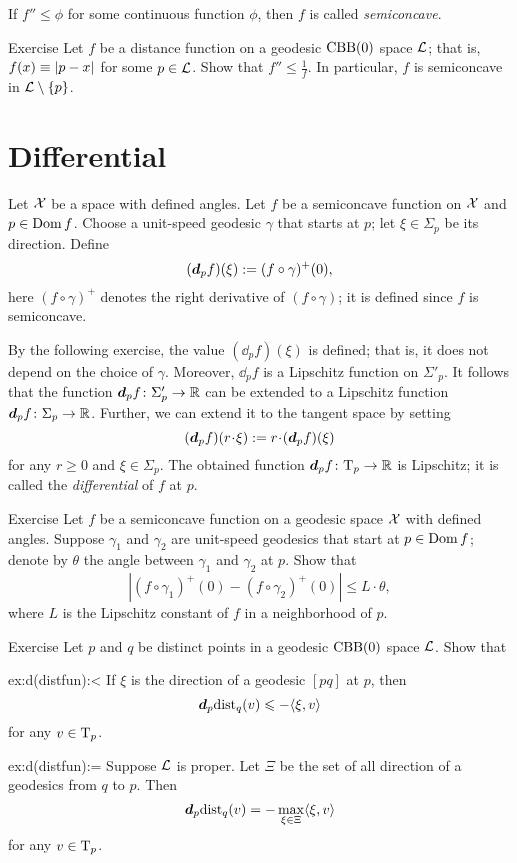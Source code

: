 If $f''\le \phi$ for some continuous function $\phi$, then $f$ is called  \emph{semiconcave}.


\begin{thm}{Exercise}\label{ex:distfun-semiconcave}
Let $f$ be a distance function on a geodesic $\mathrm{CBB}(0)$ space $\mathcal{L}$;
that is, $f(x)\equiv\dist{p}{x}{}$ for some $p\in \mathcal{L}$.
Show that $f''\le \tfrac1f$.
In particular, $f$ is semiconcave in $\mathcal{L}\setminus\{p\}$.
\end{thm}


\section{Differential}

Let $\mathcal{X}$ be a space with defined angles.
Let $f$ be a semiconcave function on $\mathcal{X}$ and $p\in \mathop{\rm Dom}\nolimits f$.
Choose a unit-speed geodesic $\gamma$ that starts at $p$;
let $\xi\in\Sigma_p$ be its direction.
Define 
\[(\bm{d}_pf)(\xi)\mathrel{:=}(f\circ\gamma)^+(0),\]
here $(f\circ\gamma)^+$ denotes the right derivative of $(f\circ\gamma)$;
it is defined since $f$ is semiconcave.

By the following exercise, the value $(\dd_pf)(\xi)$ is defined; that is, it does not depend on the choice of $\gamma$.
Moreover, $\dd_pf$ is a Lipschitz function on $\Sigma'_p$.
It follows that the function $\bm{d}_pf\colon\Sigma_p'\to\mathbb{R}$ can be extended to a Lipschitz function $\bm{d}_pf\colon\Sigma_p\to\mathbb{R}$.
Further, we can extend it to the tangent space by setting 
\[(\dd_pf)(r\cdot \xi)
\df
r\cdot (\dd_pf)(\xi)\]
for any $r\ge 0$ and $\xi\in\Sigma_p$.
The obtained function $\bm{d}_pf\colon\mathrm{T}_p\to\mathbb{R}$ is Lipschitz;
it is called the \emph{differential} of $f$ at $p$.

\begin{thm}{Exercise}\label{ex:df(xi)}
Let $f$ be a semiconcave function on a geodesic space $\mathcal{X}$ with defined angles.
Suppose $\gamma_1$ and $\gamma_2$ are unit-speed geodesics that start at $p\in \mathop{\rm Dom}\nolimits f$;
denote by $\theta$ the angle between $\gamma_1$ and $\gamma_2$ at $p$.
Show that 
\[|(f\circ\gamma_1)^+(0)-(f\circ\gamma_2)^+(0)|\le L\cdot \theta,\]
where $L$ is the Lipschitz constant of $f$ in a neighborhood of $p$.
\end{thm}

\begin{thm}{Exercise}\label{ex:d(distfun)}
Let $p$ and $q$ be distinct points in a geodesic $\mathrm{CBB}(0)$ space $\mathcal{L}$.
Show that

\begin{subthm}{ex:d(distfun):<}
If $\xi$ is the direction of a geodesic $[pq]$ at $p$, then
\[\bm{d}_p\mathrm{dist}_q(v)\leqslant -\langle\xi,v\rangle\]
for any $v\in\mathrm{T}_p$.
\end{subthm}

\begin{subthm}{ex:d(distfun):=}
Suppose $\mathcal{L}$ is proper.
Let $\Xi$ be the set of all direction of a geodesics from $q$ to $p$.
Then
\[\bm{d}_p\mathrm{dist}_q(v)=-\max_{\xi\in\Xi}\langle\xi,v\rangle\]
for any $v\in\mathrm{T}_p$.
\end{subthm}
\end{thm}


